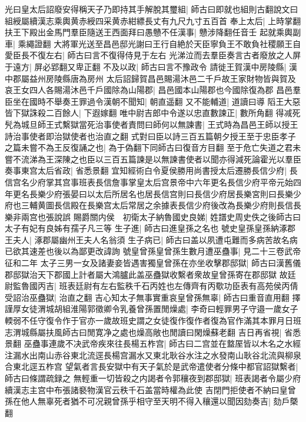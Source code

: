 光曰皇太后詔廢安得稱天子乃即持其手解脫其璽組|{
	師古曰即就也組則古翻說文曰組綬屬續漢志乘輿黄赤綬四采黄赤紺縹長丈有九尺九寸五百首}
奉上太后|{
	上時掌翻}
扶王下殿出金馬門羣臣隨送王西面拜曰愚戇不任漢事|{
	戇涉降翻任音壬}
起就乘輿副車|{
	乘繩證翻}
大將軍光送至昌邑邸光謝曰王行自絶於天臣寧負王不敢負社稷願王自愛臣長不復左右|{
	師古曰言不復得侍見于左右}
光涕泣而去羣臣奏言古者廢放之人屏于遠方|{
	屏必郢翻又卑正翻}
不及以政|{
	師古曰言不豫政令}
請徙王賀漢中房陵縣|{
	漢中郡屬益州房陵縣唐為房州}
太后詔歸賀昌邑賜湯沐邑二千戶故王家財物皆與賀及哀王女四人各賜湯沐邑千戶國除為山陽郡|{
	昌邑國本山陽郡也今國除復為郡}
昌邑羣臣坐在國時不舉奏王罪過令漢朝不聞知|{
	朝直遥翻}
又不能輔道|{
	道讀曰導}
䧟王大惡皆下獄誅殺二百餘人|{
	下遐嫁翻}
唯中尉吉郎中令遂以忠直數諫正|{
	數所角翻}
得减死髠為城旦師王式繫獄當死治事使者責問曰師何以無諫書|{
	王式時為昌邑王師以授王詩治事使者即治獄使者也治直之翻}
式對曰臣以詩三百五篇朝夕授王至于忠臣孝子之篇未嘗不為王反復誦之也|{
	為于偽翻下同師古曰復音方目翻}
至于危亡失道之君未嘗不流涕為王深陳之也臣以三百五篇諫是以無諫書使者以聞亦得減死論霍光以羣臣奏事東宫太后省政|{
	省悉景翻}
宜知經術白令夏侯勝用尚書授太后遷勝長信少府|{
	長信宫名少府掌其宫事班表長信詹事掌皇太后宫景帝中六年更名長信少府平帝元始四年更名長樂少府張晏曰以太后所居名也居長信宫則曰長信少府居長樂宮則曰長樂少府也三輔黄圖長信殿在長樂宫太后常居之余據表長信少府後改為長樂少府則長信長樂非兩宫也張說誤}
賜爵關内侯　初衛太子納魯國史良娣|{
	姓譜史周史佚之後師古曰太子有妃有良姊有孺子凡三等}
生子進|{
	師古曰進皇孫之名也}
號史皇孫皇孫納涿郡王夫人|{
	涿郡屬幽州王夫人名翁須}
生子病已|{
	師古曰盖以夙遭屯難而多病苦故名病已欲其速差也後以為鄙更改諱詢}
號皇曾孫皇曾孫生數月遭巫蠱事|{
	見二十三卷武帝征和二年}
太子三男一女及諸妻妾皆遇害獨皇曾孫在亦坐收擊郡邸獄|{
	師古曰漢舊儀郡邸獄治天下郡國上計者屬大鴻臚此盖巫蠱獄收繫者衆故皇曾孫寄在郡邸獄}
故廷尉監魯國丙吉|{
	班表廷尉有左右監秩千石丙姓也左傳齊有丙歜功臣表有高苑侯丙倩}
受詔治巫蠱獄|{
	治直之翻}
吉心知太子無事實重哀皇曾孫無辜|{
	師古曰重音直用翻}
擇謹厚女徒渭城胡組淮陽郭徵卿令乳養曾孫置閒燥處|{
	李奇曰輕罪男子守邉一歲女子輭弱不任守復令作于官亦一歲故班史謂之女徒復作復作者復為官作滿其本罪月日班志渭城縣屬扶風師古曰閒寛净之處也燥高敞也閒讀曰閑燥蘇老翻}
吉日再省視|{
	省悉景翻}
巫蠱事連歲不决武帝疾來往長楊五柞宫|{
	師古曰二宫並在盩厔皆以木名之水經注漏水出南山赤谷東北流逕長楊宫漏水又東北耿谷水注之水發南山耿谷北流與柳泉合東北逕五柞宫}
望氣者言長安獄中有天子氣於是武帝遣使者分條中都官詔獄繫者|{
	師古曰條謂疏録之}
無輕重一切皆殺之内謁者令郭穰夜到郡邸獄|{
	班表謁者令屬少府續漢志主宫中布張諸褻物漢官云秩千石盖當時權為此使}
吉閉門拒使者不納曰皇曾孫在他人無辜死者猶不可况親曾孫乎相守至天明不得入穰還以聞因劾奏吉|{
	劾戶槩翻}
